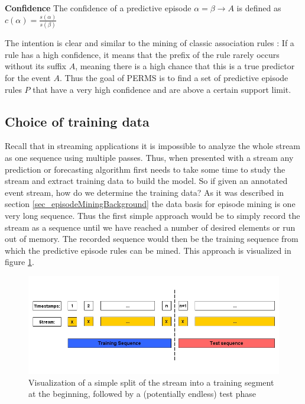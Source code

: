 \begin{mydef}
\label{def_confidence}
\textbf{Confidence} The confidence of a predictive episode $\alpha = \beta \rightarrow A$ is defined as $c(\alpha) = \frac{s(\alpha)}{s(\beta)}$ \cite{meger2004constraint}
\end{mydef}

The intention is clear and similar to the mining of classic association rules \cite{agrawal1994fast}: If a rule has a high confidence, it means that the prefix of the rule rarely occurs without its suffix $A$, meaning there is a high chance that this is a true predictor for the event $A$. Thus the goal of PERMS is to find a set of predictive episode rules $P$ that have a very high confidence and are above a certain support limit.

\subsection{Choice of training data}
Recall that in streaming applications it is impossible to analyze the whole stream as one sequence using multiple passes. Thus, when presented with a stream any prediction or forecasting algorithm first needs to take some time to study the stream and extract training data to build the model. So if given an annotated event stream, how do we determine the training data? As it was described in section \ref{sec_episodeMiningBackground} the data basis for episode mining is one very long sequence. Thus the first simple approach would be to simply record the stream as a sequence until we have reached a number of desired elements or run out of memory. The recorded sequence would then be the training sequence from which the predictive episode rules can be mined. This approach is visualized in figure \ref{fig_trainingDataNaive}.

\begin{figure}[h]
	\centering
  	\includegraphics[width=\textwidth]{trainingDataNaive}
	\caption{Visualization of a simple split of the stream into a training segment at the beginning, followed by a (potentially endless) test phase}
	\label{fig_trainingDataNaive}
\end{figure}

